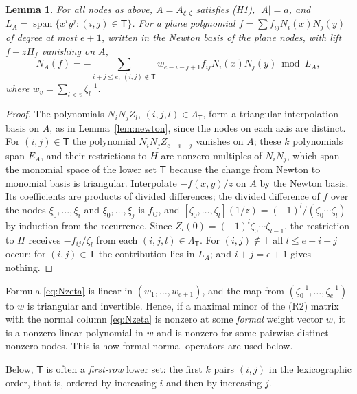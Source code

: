 \documentclass{amsart}
\newtheorem{lemma}[theorem]{Lemma}
\theoremstyle{definition}
\theoremstyle{remark}
\numberwithin{equation}{section}
\begin{document}
\begin{lemma}\label{lem:cartesian}
For all nodes as above, $A=A_{\xi,\zeta}$ satisfies (H1), $|A|=a$, and
$L_A=\operatorname{span}\{x^iy^j:(i,j)\in\mathsf T\}$. For a plane polynomial
$f=\sum f_{ij}N_i(x)N_j(y)$ of degree at most $e+1$, written in the Newton basis of the
plane nodes, with lift $f+zH_f$ vanishing on $A$,
\begin{equation}\label{eq:Nzeta}
  N_A(f)=-\sum_{i+j\le e,\ (i,j)\notin\mathsf T}w_{e-i-j+1}f_{ij}N_i(x)N_j(y)\bmod L_A,
\end{equation}
where $w_v=\sum_{l<v}\zeta_l^{-1}$.
\end{lemma}

\begin{proof}
The polynomials $N_iN_jZ_l$, $(i,j,l)\in\Lambda_{\mathsf T}$, form a triangular
interpolation basis on $A$, as in Lemma~\ref{lem:newton}, since the nodes on each axis are
distinct. For $(i,j)\in\mathsf T$ the polynomial $N_iN_jZ_{e-i-j}$ vanishes on $A$; these
$k$ polynomials span $E_A$, and their restrictions to $H$ are nonzero multiples of
$N_iN_j$, which span the monomial space of the lower set $\mathsf T$ because the change
from Newton to monomial basis is triangular. Interpolate $-f(x,y)/z$ on $A$ by the Newton
basis. Its coefficients are products of divided differences; the divided difference of
$f$ over the nodes $\xi_0,\dots,\xi_i$ and $\xi_0,\dots,\xi_j$ is $f_{ij}$, and
$[\zeta_0,\dots,\zeta_l](1/z)=(-1)^l/(\zeta_0\cdots\zeta_l)$ by induction from the
recurrence. Since $Z_l(0)=(-1)^l\zeta_0\cdots\zeta_{l-1}$, the restriction to $H$
receives $-f_{ij}/\zeta_l$ from each $(i,j,l)\in\Lambda_{\mathsf T}$. For $(i,j)\notin
\mathsf T$ all $l\le e-i-j$ occur; for $(i,j)\in\mathsf T$ the contribution lies in
$L_A$; and $i+j=e+1$ gives nothing.
\end{proof}

Formula \eqref{eq:Nzeta} is linear in $(w_1,\dots,w_{e+1})$, and the map from
$(\zeta_0^{-1},\dots,\zeta_e^{-1})$ to $w$ is triangular and invertible. Hence, if a
maximal minor of the (R2) matrix with the normal column \eqref{eq:Nzeta} is nonzero at
some \emph{formal} weight vector $w$, it is a nonzero linear polynomial in $w$ and is
nonzero for some pairwise distinct nonzero nodes. This is how formal normal operators
are used below.

Below, $\mathsf T$ is often a \emph{first-row} lower set: the first $k$ pairs
$(i,j)$ in the lexicographic order, that is, ordered by increasing $i$ and then by
increasing $j$.
\end{document}
